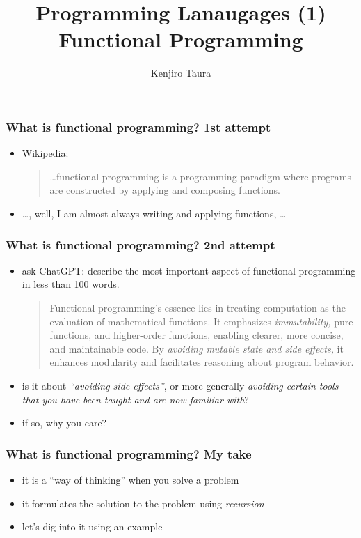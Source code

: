 \documentclass[12pt,dvipdfmx]{beamer}
\title{Programming Lanaugages (1) \\
Functional Programming}
\institute{}
\author{Kenjiro Taura}
\date{}
\newcommand{\ao}[1]{{\color{blue}#1}}
\begin{document}
\maketitle


\begin{frame}
  \frametitle{What is functional programming? 1st attempt}
  \begin{itemize}
  \item Wikipedia:
    \begin{quote}
    \ldots functional programming is a programming paradigm where programs are constructed by applying and composing functions.
    \end{quote}

  \item \ldots, well, I am almost always writing and applying functions, \ldots
  \end{itemize}
\end{frame}

\begin{frame}
  \frametitle{What is functional programming? 2nd attempt}
  \begin{itemize}
  \item ask ChatGPT: describe the most important aspect of functional programming in less than 100 words.
    \begin{quote}
      Functional programming's essence lies in treating computation as
      the evaluation of mathematical functions. It emphasizes
      \ao{\it immutability,} pure functions, and higher-order functions,
      enabling clearer, more concise, and maintainable code. By
      \ao{\it avoiding mutable state and side effects,} it enhances modularity
      and facilitates reasoning about program behavior.
    \end{quote}
  \item is it about \ao{\it ``avoiding side effects''}, or more generally
    \ao{\it avoiding certain tools that you have been taught and are now familiar with}?
  \item if so, why you care?
  \end{itemize}
\end{frame}

\begin{frame}
  \frametitle{What is functional programming? My take}
  \begin{itemize}
  \item it is a ``way of thinking'' when you solve a problem
  \item it formulates the solution to the problem using \ao{\it recursion}
  \item let's dig into it using an example
  \end{itemize}
\end{frame}
\end{document}
